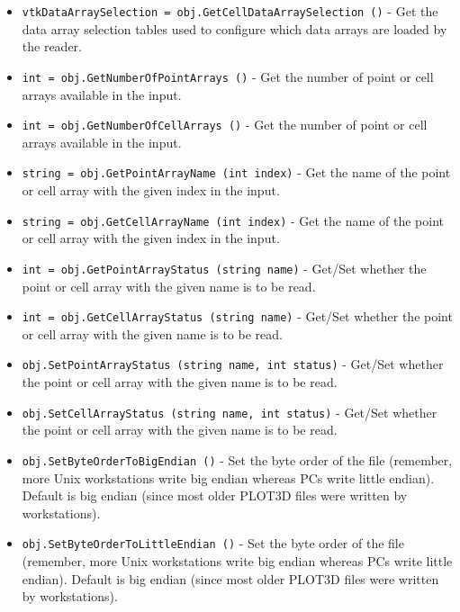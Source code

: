 \begin{itemize}
\item  \verb|vtkDataArraySelection = obj.GetCellDataArraySelection ()| -  Get the data array selection tables used to configure which data
 arrays are loaded by the reader.

\item  \verb|int = obj.GetNumberOfPointArrays ()| -  Get the number of point or cell arrays available in the input.

\item  \verb|int = obj.GetNumberOfCellArrays ()| -  Get the number of point or cell arrays available in the input.

\item  \verb|string = obj.GetPointArrayName (int index)| -  Get the name of the point or cell array with the given index in
 the input.

\item  \verb|string = obj.GetCellArrayName (int index)| -  Get the name of the point or cell array with the given index in
 the input.

\item  \verb|int = obj.GetPointArrayStatus (string name)| -  Get/Set whether the point or cell array with the given name is to
 be read.

\item  \verb|int = obj.GetCellArrayStatus (string name)| -  Get/Set whether the point or cell array with the given name is to
 be read.

\item  \verb|obj.SetPointArrayStatus (string name, int status)| -  Get/Set whether the point or cell array with the given name is to
 be read.

\item  \verb|obj.SetCellArrayStatus (string name, int status)| -  Get/Set whether the point or cell array with the given name is to
 be read.

\item  \verb|obj.SetByteOrderToBigEndian ()| -  Set the byte order of the file (remember, more Unix workstations
 write big endian whereas PCs write little endian). Default is
 big endian (since most older PLOT3D files were written by
 workstations).

\item  \verb|obj.SetByteOrderToLittleEndian ()| -  Set the byte order of the file (remember, more Unix workstations
 write big endian whereas PCs write little endian). Default is
 big endian (since most older PLOT3D files were written by
 workstations).


\end{itemize}
